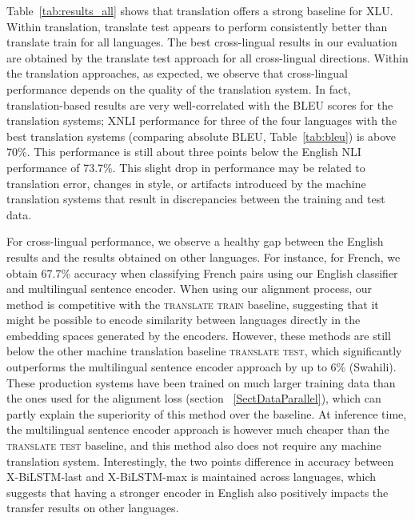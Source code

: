 \documentclass[11pt,a4paper]{article}
\begin{document}
Table~\ref{tab:results_all} shows that translation offers a strong baseline for XLU. Within translation, {\sc translate test} appears to perform consistently better than {\sc translate train} for all languages. The best cross-lingual results in our evaluation are obtained by the {\sc translate test} approach for all cross-lingual directions. 
Within the translation approaches, as expected, we observe that cross-lingual performance depends on the quality of the translation system. In fact, translation-based results are very well-correlated with the BLEU scores for the translation systems; XNLI performance for three of the four languages with the best translation systems (comparing absolute BLEU, Table~\ref{tab:bleu}) is above 70\%. This performance is still about three points below the English NLI performance of 73.7\%. This slight drop in performance may be related to translation error, changes in style, or artifacts introduced by the machine translation systems that result in discrepancies between the training and test data.



For cross-lingual performance, we observe a healthy gap between the English results and the results obtained on other languages. For instance, for French, we obtain 67.7\% accuracy when classifying French pairs using our English classifier and multilingual sentence encoder. When using our alignment process, our method is competitive with the \textsc{translate train} baseline, suggesting that it might be possible to encode similarity between languages directly in the embedding spaces generated by the encoders. However, these methods are still below the other machine translation baseline \textsc{translate test}, which significantly outperforms the multilingual sentence encoder approach by up to 6\% (Swahili). These production systems have been trained on much larger training data than the ones used for the alignment loss (section ~\ref{SectDataParallel}), which can partly explain the superiority of this method over the baseline. At inference time, the multilingual sentence encoder approach is however much cheaper than the \textsc{translate test} baseline, and this method also does not require any machine translation system. Interestingly, the two points difference in accuracy between X-BiLSTM-last and X-BiLSTM-max is maintained across languages, which suggests that having a stronger encoder in English also positively impacts the transfer results on other languages.


\insertABLATION
\end{document}
